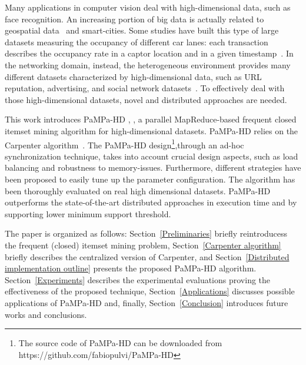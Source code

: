 Many applications in computer vision deal with high-dimensional data, such as
face recognition.
An increasing portion of big data is actually related to geospatial data~\cite{Lee201574} and
smart-cities. Some studies have built this type of large datasets
measuring the occupancy of different car lanes:
each transaction describes the occupancy rate in a captor location and in a
given timestamp~\cite{PEMSDataset}.
In the networking domain, instead,
the heterogeneous environment provides many different datasets
characterized by high-dimensional data,
such as URL reputation, advertising, and social network
datasets~\cite{snapnets}.
To effectively deal with those high-dimensional datasets,
novel and distributed approaches are needed.

This work introduces PaMPa-HD \cite{pampa_v1}, \cite{pampa_pulvi},
a parallel MapReduce-based frequent closed itemset mining algorithm
for high-dimensional datasets.
PaMPa-HD relies on the Carpenter algorithm~\cite{Zaki_Carpenter}. 
The PaMPa-HD design\footnote{The source code of PaMPa-HD can be downloaded from https://github.com/fabiopulvi/PaMPa-HD},through an ad-hoc synchronization technique, takes into account crucial design aspects,
such as load balancing and robustness to memory-issues. Furthermore, different strategies have been proposed to easily tune up the parameter configuration.
The algorithm has been thoroughly evaluated on real high dimensional datasets. 
PaMPa-HD outperforms the state-of-the-art distributed approaches
in execution time and by supporting lower minimum support threshold. 


The paper is organized as follows:
Section~\ref{Preliminaries} briefly reintroducess the frequent (closed) itemset mining
problem,
Section~\ref{Carpenter algorithm} briefly describes the centralized version
of Carpenter,
and Section~\ref{Distributed implementation outline} presents the proposed
PaMPa-HD algorithm.
Section~\ref{Experiments} describes the experimental evaluations
proving the effectiveness of the proposed technique,
Section~\ref{Applications} discusses possible applications of PaMPa-HD and, finally, Section~\ref{Conclusion} introduces future works and conclusions.


